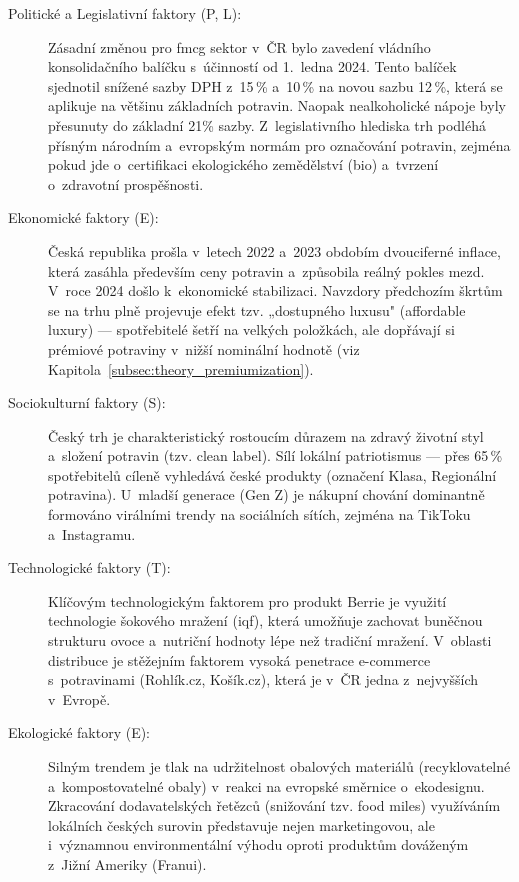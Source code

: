 \begin{description}
  \item[Politické a Legislativní faktory (P, L):] Zásadní změnou pro \gls{fmcg} sektor v~ČR bylo zavedení vládního konsolidačního balíčku s~účinností od 1.\ ledna 2024. Tento balíček sjednotil snížené sazby DPH z~15\,\% a~10\,\% na novou sazbu 12\,\%, která se aplikuje na většinu základních potravin. Naopak nealkoholické nápoje byly přesunuty do základní 21\% sazby. Z~legislativního hlediska trh podléhá přísným národním a~evropským normám pro označování potravin, zejména pokud jde o~certifikaci ekologického zemědělství (\gls{bio}) a~tvrzení o~zdravotní prospěšnosti.
  \item[Ekonomické faktory (E):] Česká republika prošla v~letech 2022 a~2023 obdobím dvouciferné inflace, která zasáhla především ceny potravin a~způsobila reálný pokles mezd. V~roce 2024 došlo k~ekonomické stabilizaci. Navzdory předchozím škrtům se na trhu plně projevuje efekt tzv. „dostupného luxusu" (affordable luxury) — spotřebitelé šetří na velkých položkách, ale dopřávají si prémiové potraviny v~nižší nominální hodnotě (viz Kapitola~\ref{subsec:theory_premiumization}).
  \item[Sociokulturní faktory (S):] Český trh je charakteristický rostoucím důrazem na zdravý životní styl a~složení potravin (tzv. clean label). Sílí lokální patriotismus — přes 65\,\% spotřebitelů cíleně vyhledává české produkty (označení Klasa, Regionální potravina). U~mladší generace (Gen Z) je nákupní chování dominantně formováno virálními trendy na sociálních sítích, zejména na TikToku a~Instagramu.
  \item[Technologické faktory (T):] Klíčovým technologickým faktorem pro produkt Berrie je využití technologie šokového mražení (\gls{iqf}), která umožňuje zachovat buněčnou strukturu ovoce a~nutriční hodnoty lépe než tradiční mražení. V~oblasti distribuce je stěžejním faktorem vysoká penetrace e-commerce s~potravinami (Rohlík.cz, Košík.cz), která je v~ČR jedna z~nejvyšších v~Evropě.
  \item[Ekologické faktory (E):] Silným trendem je tlak na udržitelnost obalových materiálů (recyklovatelné a~kompostovatelné obaly) v~reakci na evropské směrnice o~ekodesignu. Zkracování dodavatelských řetězců (snižování tzv. food miles) využíváním lokálních českých surovin představuje nejen marketingovou, ale i~významnou environmentální výhodu oproti produktům dováženým z~Jižní Ameriky (Franui).
\end{description}

